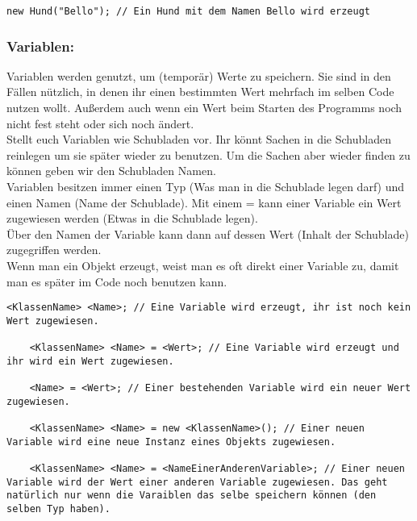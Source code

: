 \begin{lstlisting}[title=\textbf{Objekt erstellen Beispiel}]
	new Hund("Bello"); // Ein Hund mit dem Namen Bello wird erzeugt
\end{lstlisting}
\begin{Infobox}
	\subsubsection*{Variablen:}
	Variablen werden genutzt, um (temporär) Werte zu speichern.
	Sie sind in den Fällen nützlich, in denen ihr einen bestimmten Wert mehrfach im selben Code nutzen wollt.
	Außerdem auch wenn ein Wert beim Starten des Programms noch nicht fest steht oder sich noch ändert.\\

	Stellt euch Variablen wie Schubladen vor. Ihr könnt Sachen in die Schubladen reinlegen um sie später wieder zu benutzen. Um die Sachen aber wieder finden zu können geben wir den Schubladen Namen.\\

	Variablen besitzen immer einen Typ (Was man in die Schublade legen darf) und einen Namen (Name der Schublade).
	Mit einem = kann einer Variable ein Wert zugewiesen werden (Etwas in die Schublade legen).\\
	Über den Namen der Variable kann dann auf dessen Wert (Inhalt der Schublade) zugegriffen werden.\\

	Wenn man ein Objekt erzeugt, weist man es oft direkt einer Variable zu, damit man es später im Code noch benutzen kann.
\end{Infobox}
\begin{lstlisting}[title=\textbf{Variablen Syntax}]
	<KlassenName> <Name>; // Eine Variable wird erzeugt, ihr ist noch kein Wert zugewiesen.
	
	<KlassenName> <Name> = <Wert>; // Eine Variable wird erzeugt und ihr wird ein Wert zugewiesen.
	
	<Name> = <Wert>; // Einer bestehenden Variable wird ein neuer Wert zugewiesen.
	
	<KlassenName> <Name> = new <KlassenName>(); // Einer neuen Variable wird eine neue Instanz eines Objekts zugewiesen.
	
	<KlassenName> <Name> = <NameEinerAnderenVariable>; // Einer neuen Variable wird der Wert einer anderen Variable zugewiesen. Das geht natürlich nur wenn die Varaiblen das selbe speichern können (den selben Typ haben).
\end{lstlisting}
